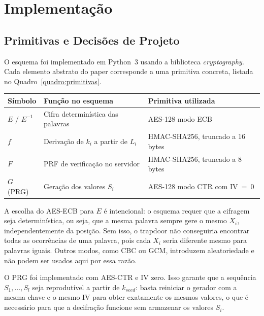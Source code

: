\documentclass[
  12pt,
  oneside,
  a4paper,
  brazil
]{abntex2}
\begin{document}
\chapter{Implementação}

\section{Primitivas e Decisões de Projeto}

O esquema foi implementado em Python~3 usando a biblioteca
\textit{cryptography}. Cada elemento abstrato do paper corresponde a
uma primitiva concreta, listada no Quadro~\ref{quadro:primitivas}.

\begin{quadro}[htb]
\caption{Mapeamento de primitivas criptográficas}
\label{quadro:primitivas}
\begin{tabular}{p{2.8cm}p{5.5cm}p{4.8cm}}
\hline
\textbf{Símbolo} & \textbf{Função no esquema} & \textbf{Primitiva utilizada} \\
\hline
$E$ / $E^{-1}$ & Cifra determinística das palavras & AES-128 modo ECB \\
$f$ & Derivação de $k_i$ a partir de $L_i$ & HMAC-SHA256, truncado a 16 bytes \\
$F$ & PRF de verificação no servidor & HMAC-SHA256, truncado a 8 bytes \\
$G$ (PRG) & Geração dos valores $S_i$ & AES-128 modo CTR com IV~=~0 \\
\hline
\end{tabular}
\end{quadro}

A escolha do AES-ECB para $E$ é intencional: o esquema requer que a
cifragem seja determinística, ou seja, que a mesma palavra sempre gere
o mesmo $X_i$, independentemente da posição. Sem isso, o trapdoor não
conseguiria encontrar todas as ocorrências de uma palavra, pois cada
$X_i$ seria diferente mesmo para palavras iguais. Outros modos, como
CBC ou GCM, introduzem aleatoriedade e não podem ser usados aqui por
essa razão.

O PRG foi implementado com AES-CTR e IV zero. Isso garante que a
sequência $S_1, \ldots, S_l$ seja reprodutível a partir de
$k_{\mathit{seed}}$: basta reiniciar o gerador com a mesma chave e o
mesmo IV para obter exatamente os mesmos valores, o que é necessário
para que a decifração funcione sem armazenar os valores $S_i$.
\end{document}
